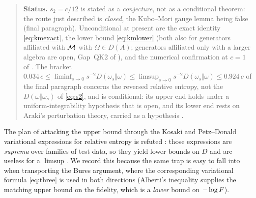 \begin{quote}
\textbf{Status.}  $s_{2}=c/12$ is stated as a \emph{conjecture}, not as a conditional theorem: the route
just described is \emph{closed}, the Kubo--Mori gauge lemma being false (final paragraph).  Unconditional
at present are the exact identity \eqref{eq:kmexact}, the lower bound \eqref{eq:kmlower} (both also for generators affiliated with $\mathcal M$ with $\Omega\in D(A)$; generators affiliated only with a larger algebra are open, Gap~QK2 of \cite{RigorKM}),
and the numerical confirmation at $c=1$ of .  The bracket $0.034\,c\le\liminf_{s\to0}s^{-2}D(\omega_{s}\Vert\omega)\le\limsup_{s\to0}s^{-2}D(\omega_{s}\Vert\omega)\le0.924\,c$ of the
final paragraph concerns the reversed relative entropy, not the $D(\omega\Vert\omega_{s})$ of \eqref{eq:s2}, and is conditional: its upper end holds under a uniform-integrability hypothesis that is open, and its lower end rests on Araki's perturbation theory, carried as a hypothesis \cite{RigorRK}.
\end{quote}

\begin{remark}\label{rem:kosaki}
The plan of attacking the upper bound through the Kosaki and Petz--Donald variational expressions for
relative entropy is refuted \cite[\S6]{RigorKM}: those expressions are \emph{suprema} over families of
test data, so they yield lower bounds on $D$ and are useless for a $\limsup$.  We record this because the
same trap is easy to fall into when transporting the Bures argument, where the corresponding variational
formula \eqref{eq:three} is used in both directions (Alberti's inequality supplies the matching upper bound
on the fidelity, which is a \emph{lower} bound on $-\log F$).
\end{remark}

